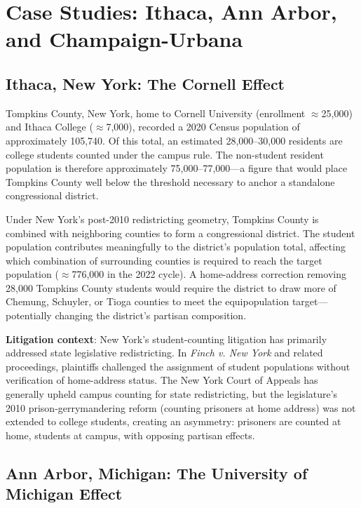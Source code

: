 \section{Case Studies: Ithaca, Ann Arbor, and Champaign-Urbana}
\label{sec:casestudies}

\subsection{Ithaca, New York: The Cornell Effect}

Tompkins County, New York, home to Cornell University (enrollment $\approx$25,000) and Ithaca College ($\approx$7,000), recorded a 2020 Census population of approximately 105,740. Of this total, an estimated 28,000--30,000 residents are college students counted under the campus rule. The non-student resident population is therefore approximately 75,000--77,000---a figure that would place Tompkins County well below the threshold necessary to anchor a standalone congressional district.

Under New York's post-2010 redistricting geometry, Tompkins County is combined with neighboring counties to form a congressional district. The student population contributes meaningfully to the district's population total, affecting which combination of surrounding counties is required to reach the target population ($\approx$776,000 in the 2022 cycle). A home-address correction removing 28,000 Tompkins County students would require the district to draw more of Chemung, Schuyler, or Tioga counties to meet the equipopulation target---potentially changing the district's partisan composition.

\textbf{Litigation context}: New York's student-counting litigation has primarily addressed state legislative redistricting. In \emph{Finch v. New York} and related proceedings, plaintiffs challenged the assignment of student populations without verification of home-address status. The New York Court of Appeals has generally upheld campus counting for state redistricting, but the legislature's 2010 prison-gerrymandering reform (counting prisoners at home address) was not extended to college students, creating an asymmetry: prisoners are counted at home, students at campus, with opposing partisan effects.

\subsection{Ann Arbor, Michigan: The University of Michigan Effect}

